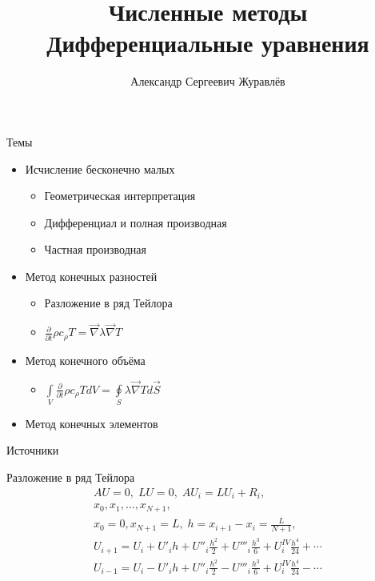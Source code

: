 \documentclass[12pt]{beamer}
\author{Александр Сергеевич Журавлёв}
\title[Дифференциальные уравнения]{Численные методы \\ Дифференциальные уравнения}
\institute{Физико-технический институт}
\begin{document}
\begin{frame}
    \titlepage
\end{frame}


\begin{frame}{Темы}
    \begin{itemize}
        \item Исчисление бесконечно малых
            \begin{itemize}
                \item Геометрическая интерпретация
                \item Дифференциал и полная производная                
                \item Частная производная
            \end{itemize}
        \item Метод конечных разностей
            \begin{itemize}
                \item Разложение в ряд Тейлора        
                \item $\frac{\partial}{\partial t} \rho c_{\rho} T = \vec{\nabla}  \lambda \vec{\nabla} T$      
            \end{itemize}
        \item Метод конечного объёма
            \begin{itemize}
                \item $\int \limits_{V} \frac{\partial}{\partial t} \rho c_{\rho} T dV = \oint \limits_{S}  \lambda \vec{\nabla} T d \vec{S}$               
            \end{itemize}
        \item Метод конечных элементов          
    \end{itemize}
\end{frame}

\begin{frame}{Источники}
\end{frame}

\begin{frame}{Разложение в ряд Тейлора}
\begin{eqnarray}
AU=0,\; LU=0,\; AU_{i}=LU_{i}+R_{i},\\
x_{0}, x_{1}, \dots, x_{N+1},\\
x_{0}=0, x_{N+1}=L,\; h=x_{i+1}-x_{i}=\frac{L}{N+1},\\
U_{i+1}=U_{i}+U'_{i}h+U''_{i}\frac{h^2}{2}+U'''_{i}\frac{h^3}{6}+U^{IV}_{i}\frac{h^4}{24}+\cdots\\
U_{i-1}=U_{i}-U'_{i}h+U''_{i}\frac{h^2}{2}-U'''_{i}\frac{h^3}{6}+U^{IV}_{i}\frac{h^4}{24}-\cdots
\end{eqnarray}
\end{frame}
\end{document}
